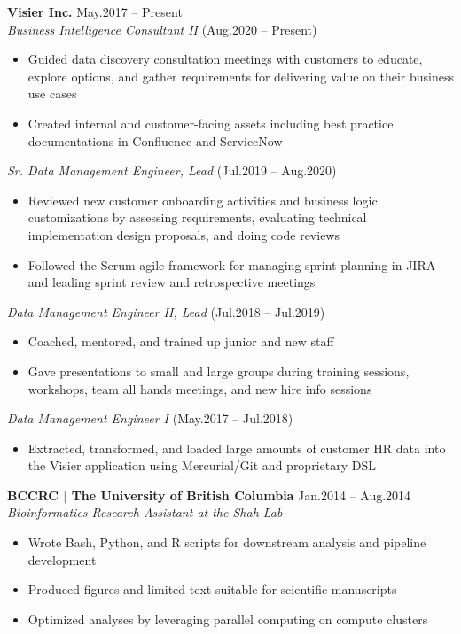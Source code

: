 \documentclass{res}
\newcommand{\linehead}[2]{%
  {\bf #1} \hfill #2\\}
\newcommand{\linetitle}[1]{%
  {\sl #1}}
\begin{document}
\begin{resume}
\linehead{Visier Inc.}{May.2017 -- Present}
\linetitle{Business Intelligence Consultant II}{ (Aug.2020 -- Present)}
\begin{itemize}
  \item Guided data discovery consultation meetings with customers to educate, explore options, and gather requirements for delivering value on their business use cases
  \item Created internal and customer-facing assets including best practice documentations in Confluence and ServiceNow
\end{itemize}
\vspace{-1em}
\linetitle{Sr. Data Management Engineer, Lead}{ (Jul.2019 -- Aug.2020)}
\begin{itemize}
  \item Reviewed new customer onboarding activities and business logic customizations by assessing requirements, evaluating technical implementation design proposals, and doing code reviews
  \item Followed the Scrum agile framework for managing sprint planning in JIRA and leading sprint review and retrospective meetings
\end{itemize}
\vspace{-1em}
\linetitle{Data Management Engineer II, Lead}{ (Jul.2018 -- Jul.2019)}
\begin{itemize}
  \item Coached, mentored, and trained up junior and new staff
  \item Gave presentations to small and large groups during training sessions, workshops, team all hands meetings, and new hire info sessions
\end{itemize}
\vspace{-1em}
\linetitle{Data Management Engineer I}{ (May.2017 -- Jul.2018)}
\begin{itemize}
  \item Extracted, transformed, and loaded large amounts of customer HR data into the Visier application using Mercurial/Git and proprietary DSL
\end{itemize}


\linehead{BCCRC $|$ The University of British Columbia}{Jan.2014 -- Aug.2014}
\linetitle{Bioinformatics Research Assistant at the Shah Lab}
\begin{itemize}
  \item Wrote Bash, Python, and R scripts for downstream analysis and pipeline development
  \item Produced figures and limited text suitable for scientific manuscripts
  \item Optimized analyses by leveraging parallel computing on compute clusters
\end{itemize}


\end{resume}
\end{document}
